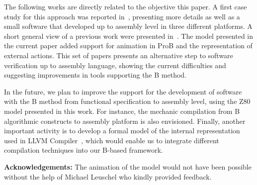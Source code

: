 \documentclass[a4paper]{llncs}
\begin{document}
The following works are directly related to the objective this paper.
A first case study for this approach was reported in~\cite{Dantas_SBMF08}, presenting
more details as well as a small software that developed up to assembly
level in three different platforms. A short general view of a previous work
were presented in~\cite{Valerio_SBMF09}. The model presented in the 
current paper added support for animation in ProB and the representation
of external actions.
This set of papers presents an alternative step to software verification
up to assembly language, showing the current difficulties and
suggesting improvements in tools supporting the B method.

In the future, we plan to improve the support for the development of
software with the B method from functional specification to assembly
level, using the Z80 model presented in this work. For instance, the
mechanic compilation from B algorithmic constructs to assembly
platform is also envisioned. Finally, another important activity is to
develop a formal model of the internal representation used in LLVM
Compiler~\cite{DBLP:conf/cgo/LattnerA04}, which would enable us to
integrate different compilation techniques into our B-based framework.


\textbf{Acknowledgements:} The animation of the model would not
have been possible without the help of Michael Leuschel who kindly
provided feedback.%



\end{document}
